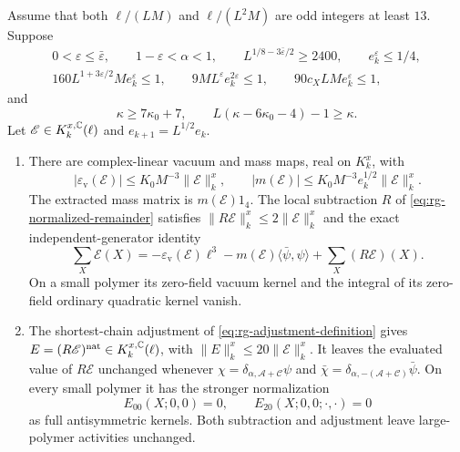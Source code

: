 \begin{theorem}\label{thm:main}
Assume that both \(\ell/(LM)\) and \(\ell/(L^2M)\) are odd
integers at least \(13\). Suppose
\begin{equation}\label{eq:rg-contraction-parameters}
 \begin{gathered}
 0<\varepsilon\le\bar\varepsilon,\qquad 1-\varepsilon<\alpha<1,
 \qquad L^{1/8-3\bar\varepsilon/2}\ge2400,\qquad e_k^\varepsilon\le1/4,\\
 160L^{1+3\varepsilon/2}Me_k^\varepsilon\le1,\qquad
 9ML^\varepsilon e_k^{2\varepsilon}\le1,\qquad
 90c_XLMe_k^\varepsilon\le1,
 \end{gathered}
\end{equation}
and
\begin{equation}\label{eq:rg-contraction-polymer-parameters}
 \kappa\ge7\kappa_0+7,\qquad
 L(\kappa-6\kappa_0-4)-1\ge\kappa.
\end{equation}
Let \(\mathscr E\in K_k^{x,\mathbb C}(\ell)\) and
\(e_{k+1}=L^{1/2}e_k\).

\begin{enumerate}[label=\textup{(\roman*)},leftmargin=*]
\item There are complex-linear vacuum and mass maps, real on
\(K_k^x\), with
\[
 |\varepsilon_{\mathrm v}(\mathscr E)|
       \le K_0M^{-3}\|\mathscr E\|_k^x,\qquad
 |m(\mathscr E)|
       \le K_0M^{-3}e_k^{1/2}\|\mathscr E\|_k^x .
\]
The extracted mass matrix is \(m(\mathscr E)1_4\).
The local subtraction \(R\) of \eqref{eq:rg-normalized-remainder}
satisfies \(\|R\mathscr E\|_k^x\le2\|\mathscr E\|_k^x\) and the
exact independent-generator identity
\[
 \sum_X\mathscr E(X)
 =-\varepsilon_{\mathrm v}(\mathscr E)\ell^3
       -m(\mathscr E)\langle\bar\psi,\psi\rangle
       +\sum_X(R\mathscr E)(X).
\]
On a small polymer its zero-field vacuum kernel and the integral
of its zero-field ordinary quadratic kernel vanish.

\item The shortest-chain adjustment of
\eqref{eq:rg-adjustment-definition} gives
\(E=(R\mathscr E)^{\mathrm{nat}}\in K_k^{x,\mathbb C}(\ell)\), with
\(\|E\|_k^x\le20\|\mathscr E\|_k^x\). It leaves the evaluated
value of \(R\mathscr E\) unchanged whenever
\(\chi=\delta_{\alpha,\mathscr A+\mathscr C}\psi\) and
\(\bar\chi=\delta_{\alpha,-(\mathscr A+\mathscr C)}\bar\psi\).
On every small polymer it has the stronger normalization
\[
 E_{00}(X;0,0)=0,\qquad E_{20}(X;0,0;\cdot,\cdot)=0
\]
as full antisymmetric kernels. Both subtraction and adjustment
leave large-polymer activities unchanged.


\end{enumerate}
\end{theorem}
